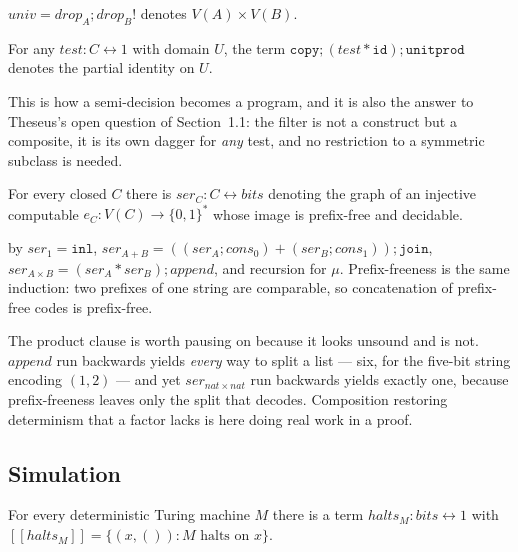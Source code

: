 \documentclass[runningheads,envcountsame]{llncs}
\newcommand{\den}[1]{\ensuremath{[\![#1]\!]}}
\newcommand{\iso}{\leftrightarrow}
\begin{document}
\begin{lemma}\label{lem:univ}
$\mathit{univ} = \mathit{drop}_A \mathbin{;} \mathit{drop}_B!$ denotes
$V(A) \times V(B)$.
\end{lemma}

\begin{lemma}[Filter]\label{lem:filt}
For any $\mathit{test} : C \iso 1$ with domain $U$, the term
$\texttt{copy} \mathbin{;} (\mathit{test} * \texttt{id}) \mathbin{;} \texttt{unitprod}$
denotes the partial identity on $U$.
\end{lemma}

This is how a semi-decision becomes a program, and it is also the answer to
Theseus's open question of Section~1.1: the filter is not a construct but a
composite, it is its own dagger for \emph{any} test, and no restriction to a
symmetric subclass is needed.

\begin{lemma}[Serialisation]\label{lem:ser}
For every closed $C$ there is $\mathit{ser}_C : C \iso \mathit{bits}$ denoting the
graph of an injective computable $e_C : V(C) \to \{0,1\}^*$ whose image is
prefix-free and decidable.
\end{lemma}

by $\mathit{ser}_1 = \texttt{inl}$,
$\mathit{ser}_{A+B} = ((\mathit{ser}_A\mathbin{;}\mathit{cons}_0) + (\mathit{ser}_B\mathbin{;}\mathit{cons}_1))\mathbin{;}\texttt{join}$,
$\mathit{ser}_{A\times B} = (\mathit{ser}_A * \mathit{ser}_B)\mathbin{;}\mathit{append}$,
and recursion for $\mu$. Prefix-freeness is the same induction: two prefixes of one
string are comparable, so concatenation of prefix-free codes is prefix-free.

The product clause is worth pausing on because it looks unsound and is not.
$\mathit{append}$ run backwards yields \emph{every} way to split a list --- six, for
the five-bit string encoding $(1,2)$ --- and yet $\mathit{ser}_{nat \times nat}$ run
backwards yields exactly one, because prefix-freeness leaves only the split that
decodes. Composition restoring determinism that a factor lacks is here doing real
work in a proof.

\subsection{Simulation}

\begin{lemma}[Halting]\label{lem:halt}
For every deterministic Turing machine $M$ there is a term
$\mathit{halts}_M : \mathit{bits} \iso 1$ with
$\den{\mathit{halts}_M} = \{(x,()) : M \text{ halts on } x\}$.
\end{lemma}
\end{document}
